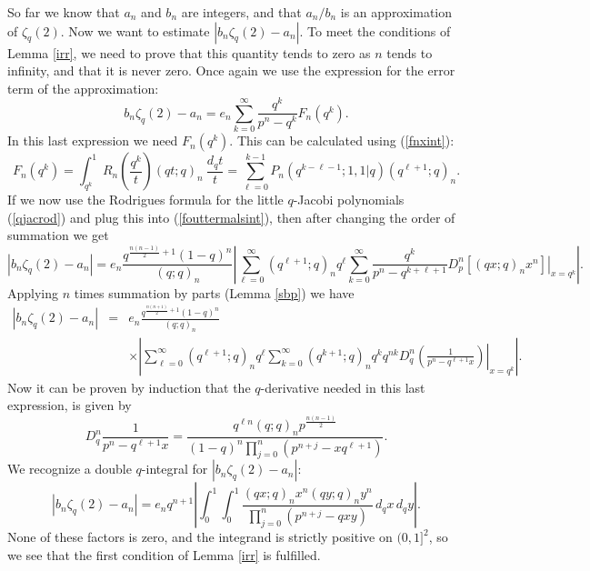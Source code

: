 \documentclass[12pt]{article}
\numberwithin{equation}{section}
\begin{document}
So far we know that $a_n$ and $b_n$ are integers, and that
${a_n}/{b_n}$ is an approximation of
$\zeta_{q}(2)$. Now we want to estimate
$\left|b_n\zeta_{q}(2)-a_n\right|$.  To meet the
conditions of Lemma \ref{irr}, we need to prove that this quantity
tends to zero as $n$ tends to infinity, and that it is never
zero.
Once again we use the expression for the error term of the
approximation:
\begin{equation} \label{bnzq2minan}
b_n\zeta_{q}\left(2\right)-a_n
=e_n\sum_{k=0}^\infty\frac{q^k}{p^{n}-q^k}F_n(q^k).
\end{equation}
In this last expression we need $F_n(q^k)$.  This can
be calculated using (\ref{fnxint}):
\begin{equation}\label{fouttermalsint}
F_n(q^k)=\int_{q^k}^1R_n\left(\frac{q^k}{t}\right)(qt;q)_n\ \frac{d_{q}t}{t}
=\sum_{\ell=0}^{k-1}P_n\left(q^{k-\ell-1};1,1|q\right)(q^{\ell+1};q)_n.
\end{equation}
If we now use the Rodrigues formula for the little $q$-Jacobi
polynomials (\ref{qjacrod}) and plug this into
(\ref{fouttermalsint}), then after changing the order of summation we
get
\begin{equation}\nonumber
\left|b_n\zeta_{q}(2)-a_n\right|=e_n\frac{q^{\frac{n(n-1)}{2}+1}(1-q)^n}{(q;q)_n}
\left|\sum_{\ell=0}^\infty (q^{\ell+1};q)_nq^\ell
\sum_{k=0}^\infty \frac{q^k}{p^n-q^{k+\ell+1}}D_{p}^n\left.\left[(qx;q)_nx^{n}\right]\right|_{x=q^k}\right|.
\end{equation}
Applying $n$ times summation by parts (Lemma \ref{sbp}) we have
\begin{eqnarray*}
\left|b_n\zeta_{q}(2)-a_n\right|&=&e_n\frac{q^{\frac{n(n+1)}{2}+1}(1-q)^n}{(q;q)_n}\\
& &\times \left|\sum_{\ell=0}^\infty (q^{\ell+1};q)_nq^\ell
\sum_{k=0}^\infty (q^{k+1};q)_nq^kq^{nk}D_{q}^n\left.\left(\frac{1}{p^n-q^{\ell+1}x}\right)\right|_{x=q^k}\right|.
\end{eqnarray*}
Now it can be proven by induction that the $q$-derivative needed
in this last expression, is given by
\[D_{q}^n\frac1{p^n-q^{\ell+1}x}
=\frac{q^{\ell n}(q;q)_np^{\frac{n(n-1)}{2}}}{(1-q)^n\prod_{j=0}^n\left(p^{n+j}-xq^{\ell+1}\right)}.\]
We recognize a double $q$-integral for
$\left|b_n\zeta_{q}(2)-a_n\right|$:
\begin{equation}\nonumber
\left|b_n\zeta_{q}(2)-a_n\right|=
e_nq^{n+1} \left|\int_0^1\int_0^1\frac{(qx;q)_nx^n(qy;q)_ny^n}{\prod_{j=0}^n (p^{n+j}-qxy)}\,d_{q}x\,d_{q}y\right|.
\end{equation}
None of these factors is zero, and the integrand is strictly
positive on $(0,1]^2$, so we see that the first
condition of Lemma \ref{irr} is fulfilled.
\end{document}
